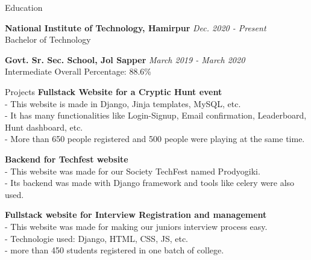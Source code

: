 \documentclass{resume}
\begin{document}
\begin{rSection}{Education}


{\bf National Institute of Technology, Hamirpur} \hfill {\em Dec. 2020 - Present} 
\\ Bachelor of Technology \hfill { }

{\bf Govt. Sr. Sec. School, Jol Sapper} \hfill {\em March 2019 - March 2020} 
\\ Intermediate \hfill { Overall Percentage: 88.6\%}
\end{rSection}

\begin{rSection}{Projects}
{\bf Fullstack Website for a Cryptic Hunt event}
\\ - This website is made in Django, Jinja templates, MySQL, etc. 
\\ - It has many functionalities like Login-Signup, Email confirmation, Leaderboard, Hunt dashboard, etc.   
\\ - More than 650 people registered and 500 people were playing at the same time.

{\bf Backend for Techfest website}
\\ - This website was made for our Society TechFest named Prodyogiki.
\\ - Its backend was made with Django framework and tools like celery were also used.


{\bf Fullstack website for Interview Registration and management}
\\ - This website was made for making our juniors interview process easy.
\\ - Technologie used: Django, HTML, CSS, JS, etc.
\\ - more than 450 students registered in one batch of college.


\end{rSection}
\end{document}
